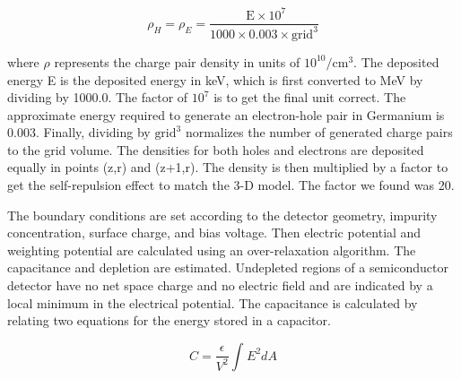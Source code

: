 \begin{equation}
    \rho_H = \rho_E= \frac{\text{ E}\times 10^7 }{1000 \times 0.003 \times \text{grid}^3}
\end{equation}

where $\rho$ represents the charge pair density in units of \(10^{10}/\text{cm}^3\). The deposited energy E is the deposited energy in keV, which is first converted to MeV by dividing by 1000.0. The factor of \(10^7\) is to get the final unit correct. The approximate energy required to generate an electron-hole pair in Germanium is \(0.003\). Finally, dividing by \(\text{grid}^3\) normalizes the number of generated charge pairs to the grid volume. The densities for both holes and electrons are deposited equally in points (z,r) and (z+1,r). The density is then multiplied by a factor to get the self-repulsion effect to match the 3-D model. The factor we found was 20.

The boundary conditions are set according to the detector geometry, impurity concentration, surface charge, and bias voltage. Then electric potential and weighting potential are calculated using an over-relaxation algorithm. The capacitance and depletion are estimated. Undepleted regions of a semiconductor detector have no net space charge and no electric field and are indicated by a local minimum in the electrical potential. The capacitance is calculated by relating two equations for the energy stored in a capacitor.

\begin{equation}\label{capacitance_eq}
C= \frac{\epsilon}{V^2} \int_{}^{} E^2 dA
\end{equation}


